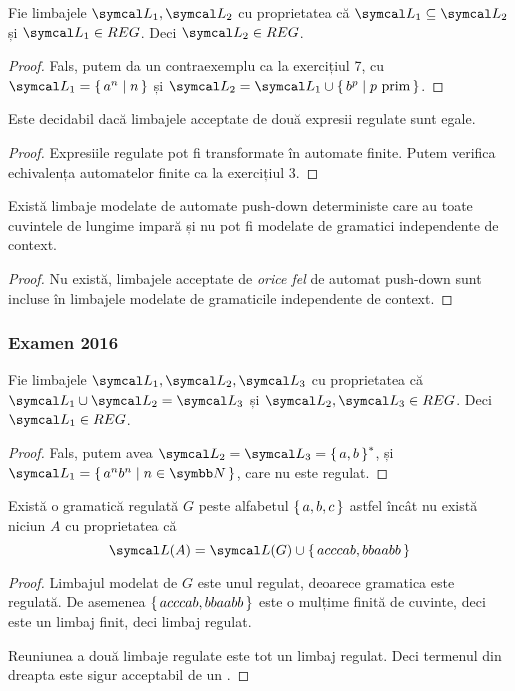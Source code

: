 \begin{exercise}
    Fie limbajele \(\limbaj_1, \limbaj_2\) cu proprietatea că \(\limbaj_1 \subseteq \limbaj_2\) și \(\limbaj_1 \in REG\). Deci \(\limbaj_2 \in REG\).
\end{exercise}
\begin{proof}
    Fals, putem da un contraexemplu ca la exercițiul 7, cu \(\limbaj_1 = \set{ a^n | n  }\) și \(\limbaj_2 = \limbaj_1 \cup \set{ b^p | p \text{ prim}}\).
\end{proof}

\begin{exercise}
    Este decidabil dacă limbajele acceptate de două expresii regulate sunt egale.
\end{exercise}
\begin{proof}
    Expresiile regulate pot fi transformate în automate finite. Putem verifica echivalența automatelor finite ca la exercițiul 3.
\end{proof}

\begin{exercise}
    Există limbaje modelate de automate push-down deterministe care au toate cuvintele de lungime impară și nu pot fi modelate de gramatici independente de context.
\end{exercise}
\begin{proof}
    Nu există, limbajele acceptate de \emph{orice fel} de automat push-down sunt incluse în limbajele modelate de gramaticile independente de context.
\end{proof}

\subsubsection*{Examen 2016}

\begin{exercise}
    Fie limbajele \(\limbaj_1, \limbaj_2, \limbaj_3\) cu proprietatea că \(\limbaj_1 \cup \limbaj_2 = \limbaj_3\) și \(\limbaj_2, \limbaj_3 \in REG\). Deci \(\limbaj_1 \in REG\).
\end{exercise}
\begin{proof}
    Fals, putem avea \(\limbaj_2 = \limbaj_3 = \set{ a, b }^*\), și \(\limbaj_1 = \set{ a^n b^n | n \in \naturals}\), care nu este regulat.
\end{proof}

\begin{exercise}
    Există o gramatică regulată \(G\) peste alfabetul \(\set{ a, b, c }\) astfel încât nu există niciun \nfa{} \(A\) cu proprietatea că
    \[\limbaj(A) = \limbaj(G) \cup \set{ acccab, bbaabb }\]
\end{exercise}
\begin{proof}
    Limbajul modelat de \(G\) este unul regulat, deoarece gramatica este regulată. De asemenea \(\set{ acccab, bbaabb }\) este o mulțime finită de cuvinte, deci este un limbaj finit, deci limbaj regulat.

    Reuniunea a două limbaje regulate este tot un limbaj regulat. Deci termenul din dreapta este sigur acceptabil de un \nfa{}.
\end{proof}

